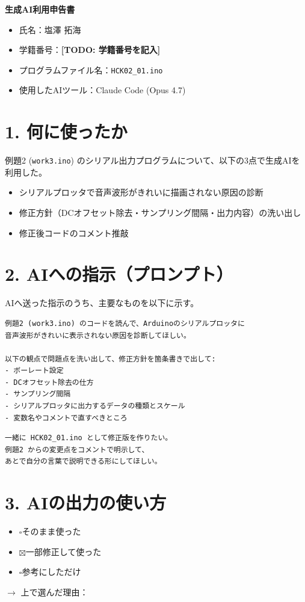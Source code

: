 \documentclass[a4paper,11pt,dvipdfmx]{jsarticle}
\newcommand{\cboxon}{$\boxtimes$}
\newcommand{\cboxoff}{$\square$}
\newcommand{\todo}[1]{\textbf{[TODO: #1]}}
\begin{document}
{\LARGE\bfseries 生成AI利用申告書}
\vspace{1em}

\begin{itemize}
  \item 氏名：塩澤 拓海
  \item 学籍番号：\todo{学籍番号を記入}
  \item プログラムファイル名：\texttt{HCK02\_01.ino}
  \item 使用したAIツール：Claude Code (Opus 4.7)
\end{itemize}

\section*{1. 何に使ったか}
例題2 (\texttt{work3.ino}) のシリアル出力プログラムについて、以下の3点で生成AIを利用した。
\begin{itemize}
  \item シリアルプロッタで音声波形がきれいに描画されない原因の診断
  \item 修正方針（DCオフセット除去・サンプリング間隔・出力内容）の洗い出し
  \item 修正後コードのコメント推敲
\end{itemize}

\section*{2. AIへの指示（プロンプト）}
AIへ送った指示のうち、主要なものを以下に示す。

\begin{lstlisting}
例題2 (work3.ino) のコードを読んで、Arduinoのシリアルプロッタに
音声波形がきれいに表示されない原因を診断してほしい。

以下の観点で問題点を洗い出して、修正方針を箇条書きで出して:
- ボーレート設定
- DCオフセット除去の仕方
- サンプリング間隔
- シリアルプロッタに出力するデータの種類とスケール
- 変数名やコメントで直すべきところ
\end{lstlisting}

\begin{lstlisting}
一緒に HCK02_01.ino として修正版を作りたい。
例題2 からの変更点をコメントで明示して、
あとで自分の言葉で説明できる形にしてほしい。
\end{lstlisting}

\section*{3. AIの出力の使い方}
\begin{itemize}
  \item \cboxoff そのまま使った
  \item \cboxon 一部修正して使った
  \item \cboxoff 参考にしただけ
\end{itemize}
$\rightarrow$ 上で選んだ理由：
\end{document}
